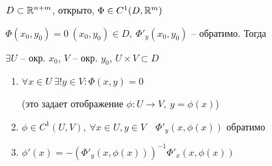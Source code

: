     \begin{theorem}
        $D \subset \mathbb{R}^{n+m}$, открыто, $\Phi \in C^1(D, \mathbb{R}^m)$
        \par $\Phi(x_0, y_0) = 0 \ (x_0, y_0) \in D, \ \Phi'_y(x_0, y_0)$ -- обратимо. Тогда
        \par $\exists U$ -- окр. $x_0$, $V$ -- окр. $y_0$, $U \times V  \subset D$
        \begin{enumerate}
            \item $\forall x \in U \ \exists! y \in V : \Phi(x, y) = 0$
            \par (это задает отображение $\phi : U \rightarrow V, \ y = \phi(x)$)
            \item $\phi \in C^1(U, V), \ \forall x \in U, y \in V \quad \Phi'_y(x, \phi(x))$ обратимо
            \item $\phi'(x) = -(\Phi'_y(x, \phi(x)))^{-1} \Phi'_x(x, \phi(x))$
        \end{enumerate}
    \end{theorem}

